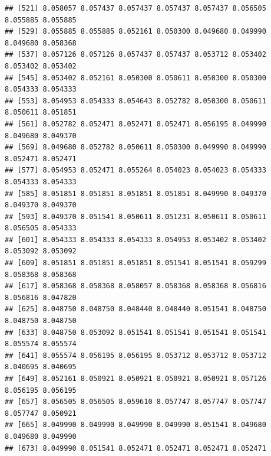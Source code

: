 \documentclass[
]{article}
\newenvironment{Shaded}{\begin{snugshade}}{\end{snugshade}}
\newcommand{\CommentTok}[1]{\textcolor[rgb]{0.56,0.35,0.01}{\textit{#1}}}
\newcommand{\DecValTok}[1]{\textcolor[rgb]{0.00,0.00,0.81}{#1}}
\newcommand{\FloatTok}[1]{\textcolor[rgb]{0.00,0.00,0.81}{#1}}
\newcommand{\FunctionTok}[1]{\textcolor[rgb]{0.00,0.00,0.00}{#1}}
\newcommand{\NormalTok}[1]{#1}
\newcommand{\OtherTok}[1]{\textcolor[rgb]{0.56,0.35,0.01}{#1}}
\newcommand{\SpecialCharTok}[1]{\textcolor[rgb]{0.00,0.00,0.00}{#1}}
\begin{document}
\begin{verbatim}
## [521] 8.058057 8.057437 8.057437 8.057437 8.057437 8.056505 8.055885 8.055885
## [529] 8.055885 8.055885 8.052161 8.050300 8.049680 8.049990 8.049680 8.058368
## [537] 8.057126 8.057126 8.057437 8.057437 8.053712 8.053402 8.053402 8.053402
## [545] 8.053402 8.052161 8.050300 8.050611 8.050300 8.050300 8.054333 8.054333
## [553] 8.054953 8.054333 8.054643 8.052782 8.050300 8.050611 8.050611 8.051851
## [561] 8.052782 8.052471 8.052471 8.052471 8.056195 8.049990 8.049680 8.049370
## [569] 8.049680 8.052782 8.050611 8.050300 8.049990 8.049990 8.052471 8.052471
## [577] 8.054953 8.052471 8.055264 8.054023 8.054023 8.054333 8.054333 8.054333
## [585] 8.051851 8.051851 8.051851 8.051851 8.049990 8.049370 8.049370 8.049370
## [593] 8.049370 8.051541 8.050611 8.051231 8.050611 8.050611 8.056505 8.054333
## [601] 8.054333 8.054333 8.054333 8.054953 8.053402 8.053402 8.053092 8.053092
## [609] 8.051851 8.051851 8.051851 8.051541 8.051541 8.059299 8.058368 8.058368
## [617] 8.058368 8.058368 8.058057 8.058368 8.058368 8.056816 8.056816 8.047820
## [625] 8.048750 8.048750 8.048440 8.048440 8.051541 8.048750 8.048750 8.048750
## [633] 8.048750 8.053092 8.051541 8.051541 8.051541 8.051541 8.055574 8.055574
## [641] 8.055574 8.056195 8.056195 8.053712 8.053712 8.053712 8.040695 8.040695
## [649] 8.052161 8.050921 8.050921 8.050921 8.050921 8.057126 8.056195 8.056195
## [657] 8.056505 8.056505 8.059610 8.057747 8.057747 8.057747 8.057747 8.050921
## [665] 8.049990 8.049990 8.049990 8.049990 8.051541 8.049680 8.049680 8.049990
## [673] 8.049990 8.051541 8.052471 8.052471 8.052471 8.052471
\end{verbatim}

\begin{Shaded}
\end{Shaded}
\end{document}
